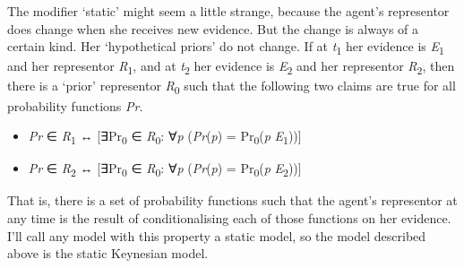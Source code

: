 \documentclass[
  10pt,
  letterpaper,
  DIV=11,
  numbers=noendperiod,
  twoside]{scrartcl}
\providecommand{\tightlist}{%
  \setlength{\itemsep}{0pt}\setlength{\parskip}{0pt}}\usepackage{longtable,booktabs,array}
\begin{document}
The modifier `static' might seem a little strange, because the agent's
representor does change when she receives new evidence. But the change
is always of a certain kind. Her `hypothetical priors' do not change. If
at \emph{t}\textsubscript{1} her evidence is \emph{E}\textsubscript{1}
and her representor \emph{R}\textsubscript{1}, and at
\emph{t}\textsubscript{2} her evidence is \emph{E}\textsubscript{2} and
her representor \emph{R}\textsubscript{2}, then there is a `prior'
representor \emph{R}\textsubscript{0} such that the following two claims
are true for all probability functions \emph{Pr}.

\begin{itemize}
\tightlist
\item
  \emph{Pr} ∈ \emph{R}\textsubscript{1} ↔ {[}∃Pr\textsubscript{0} ∈
  \emph{R}\textsubscript{0}: ∀\emph{p} (\emph{Pr}(\emph{p}) =
  Pr\textsubscript{0}(\emph{p} \emph{E}\textsubscript{1})){]}
\item
  \emph{Pr} ∈ \emph{R}\textsubscript{2} ↔ {[}∃Pr\textsubscript{0} ∈
  \emph{R}\textsubscript{0}: ∀\emph{p} (\emph{Pr}(\emph{p}) =
  Pr\textsubscript{0}(\emph{p} \emph{E}\textsubscript{2})){]}
\end{itemize}

That is, there is a set of probability functions such that the agent's
representor at any time is the result of conditionalising each of those
functions on her evidence. I'll call any model with this property a
static model, so the model described above is the static Keynesian
model.
\end{document}
